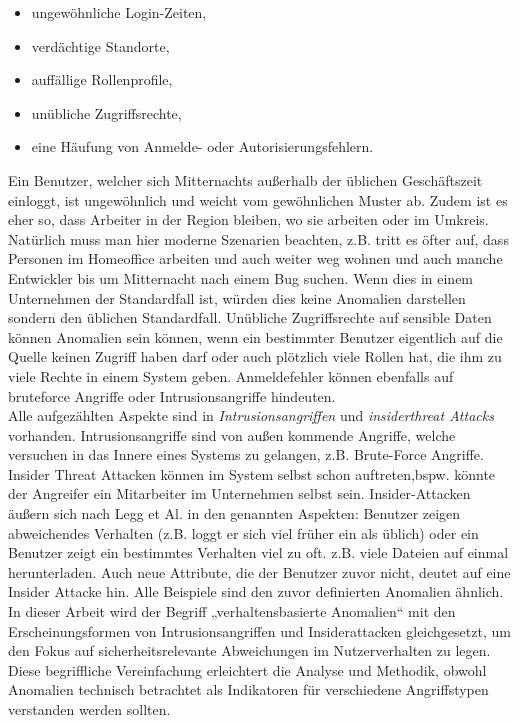 \documentclass[a4paper,12pt]{article}
\begin{document}
	\begin{itemize}
		\item ungewöhnliche Login-Zeiten,
		\item verdächtige Standorte,
		\item auffällige Rollenprofile,
		\item unübliche Zugriffsrechte,
		\item eine Häufung von Anmelde- oder Autorisierungsfehlern.
	\end{itemize}
	Ein Benutzer, welcher sich Mitternachts außerhalb der üblichen Geschäftszeit einloggt, ist ungewöhnlich und weicht vom gewöhnlichen Muster ab. Zudem ist es eher so, dass Arbeiter in der Region bleiben, wo sie arbeiten oder im Umkreis. Natürlich muss man hier moderne Szenarien beachten, z.B. tritt es öfter auf, dass Personen im Homeoffice arbeiten und auch weiter weg wohnen und auch manche Entwickler bis um Mitternacht nach einem Bug suchen. Wenn dies in einem Unternehmen der Standardfall ist, würden dies keine Anomalien darstellen sondern den üblichen Standardfall. Unübliche Zugriffsrechte auf sensible Daten können Anomalien sein können, wenn ein bestimmter Benutzer eigentlich auf die Quelle keinen Zugriff haben darf oder auch plötzlich viele Rollen hat, die ihm zu viele Rechte in einem System geben. Anmeldefehler können ebenfalls auf \gls{bruteforce} Angriffe oder Intrusionsangriffe hindeuten.
	\\[0.5em]
	Alle aufgezählten Aspekte sind in \textit{Intrusionsangriffen} und \textit{\gls{insiderthreat} Attacks} vorhanden. Intrusionsangriffe sind von außen kommende Angriffe,  welche versuchen in das Innere eines Systems zu gelangen, z.B. Brute-Force Angriffe. Insider Threat Attacken können im System selbst schon auftreten,bspw. könnte der Angreifer ein Mitarbeiter im Unternehmen selbst sein.
	Insider-Attacken äußern sich nach Legg et Al. \cite[S.2]{legg2015visualizing} in den genannten Aspekten: Benutzer zeigen abweichendes Verhalten (z.B. loggt er sich viel früher ein als üblich) oder ein Benutzer zeigt ein bestimmtes Verhalten viel zu oft. z.B. viele Dateien auf einmal herunterladen. Auch neue Attribute, die der Benutzer zuvor nicht, deutet auf eine Insider Attacke hin. Alle Beispiele sind den zuvor definierten Anomalien ähnlich.
	\\[0.5em]
	In dieser Arbeit wird der Begriff „verhaltensbasierte Anomalien“ mit den Erscheinungsformen von Intrusionsangriffen und Insiderattacken gleichgesetzt, um den Fokus auf sicherheitsrelevante Abweichungen im Nutzerverhalten zu legen. Diese begriffliche Vereinfachung erleichtert die Analyse und Methodik, obwohl Anomalien technisch betrachtet als Indikatoren für verschiedene Angriffstypen verstanden werden sollten.
\end{document}
